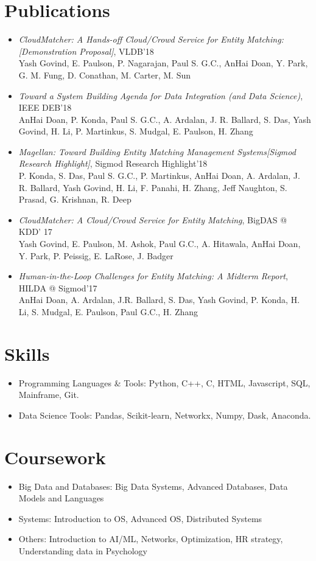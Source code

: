 \documentclass{resume}
\begin{document}
\section{Publications}
\begin{itemize}
  \item \emph{CloudMatcher: A Hands-off Cloud/Crowd Service for Entity Matching: [Demonstration Proposal]}, {VLDB'18} \\
Yash Govind, E. Paulson, P. Nagarajan, Paul S. G.C., AnHai Doan, Y. Park, G. M. Fung, D. Conathan, M. Carter, M. Sun
  \item \emph{Toward a System Building Agenda for Data Integration (and Data Science)}, {IEEE DEB'18} \\
AnHai Doan, P. Konda, Paul S. G.C., A. Ardalan, J. R. Ballard, S. Das, Yash Govind, H. Li, P. Martinkus, S. Mudgal, E. Paulson, H. Zhang
  \item \emph{Magellan: Toward Building Entity Matching Management Systems[Sigmod Research Highlight]}, {Sigmod Research Highlight'18} \\
P. Konda, S. Das, Paul S. G.C., P. Martinkus, AnHai Doan, A. Ardalan, J. R. Ballard, Yash Govind, H. Li, F. Panahi, H. Zhang, Jeff Naughton, S. Prasad, G. Krishnan, R. Deep
  \item \emph{CloudMatcher: A Cloud/Crowd Service for Entity Matching}, {BigDAS @ KDD' 17} \\
Yash Govind, E. Paulson, M. Ashok, Paul G.C., A. Hitawala, AnHai Doan, Y. Park, P. Peissig, E. LaRose, J. Badger
  \item \emph{Human-in-the-Loop Challenges for Entity Matching: A Midterm Report}, {HILDA @ Sigmod'17} \\
AnHai Doan, A. Ardalan, J.R. Ballard, S. Das, Yash Govind, P. Konda, H. Li, S. Mudgal, E. Paulson, Paul G.C., H. Zhang
\end{itemize}

\section{Skills}
\begin{itemize}[parsep=0.5ex]
  \item Programming Languages \& Tools: Python, C++, C, HTML, Javascript, SQL, Mainframe, Git.
  \item Data Science Tools: Pandas, Scikit-learn, Networkx, Numpy, Dask, Anaconda.
\end{itemize}

\section{Coursework}
\begin{itemize}[parsep=0.5ex]
  \item Big Data and Databases: Big Data Systems, Advanced Databases, Data Models and Languages
  \item Systems: Introduction to OS, Advanced OS, Distributed Systems
  \item Others: Introduction to AI/ML, Networks, Optimization, HR strategy, Understanding data in Psychology
\end{itemize}
\end{document}

